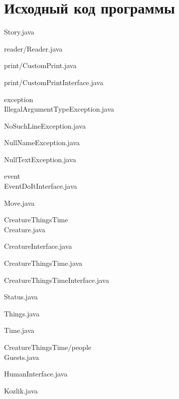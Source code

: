 \documentclass[12pt,onecolumn]{article}
\begin{document}
\section{Исходный код программы}
Story.java

reader/Reader.java

print/CustomPrint.java

print/CustomPrintInterface.java

exception\\
IllegalArgumentTypeException.java

NoSuchLineException.java

NullNameException.java

NullTextException.java

event\\
EventDoItInterface.java

Move.java

CreatureThingsTime\\
Creature.java

CreatureInterface.java

CreatureThingsTime.java

CreatureThingsTimeInterface.java

Status.java

Things.java

Time.java

CreatureThingsTime/people\\
Guests.java

HumanInterface.java

Kozlik.java

\end{document}

